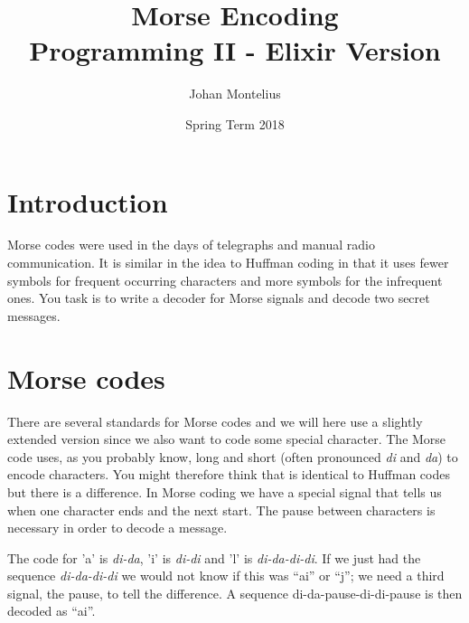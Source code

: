 \documentclass[a4paper,11pt]{article}
\begin{document}

\title{
    \textbf{Morse Encoding}\\
    \large{Programming II - Elixir Version}
}
\author{Johan Montelius}
\date{Spring Term 2018}
\maketitle
{}



\section*{Introduction}

Morse codes were used in the days of telegraphs and manual radio
communication. It is similar in the idea to Huffman coding in that it
uses fewer symbols for frequent occurring characters and more symbols
for the infrequent ones. You task is to write a decoder for Morse
signals and decode two secret messages.   



\section{Morse codes}

There are several standards for Morse codes and we will here use a
slightly extended version since we also want to code some special
character. The Morse code uses, as you probably know, long and short
(often pronounced {\em di} and {\em da}) to encode characters. You
might therefore think that is identical to Huffman codes but there is
a difference. In Morse coding we have a special signal that tells us
when one character ends and the next start. The pause between
characters is necessary in order to decode a message.

The code for 'a' is {\em di-da}, 'i' is {\em di-di} and 'l' is {\em di-da-di-di}.  If
we just had the sequence {\em di-da-di-di} we would not know if this
was ``ai'' or ``j''; we need a third signal, the pause, to tell the
difference. A sequence {di-da-pause-di-di-pause} is then decoded as ``ai''.
\end{document}
